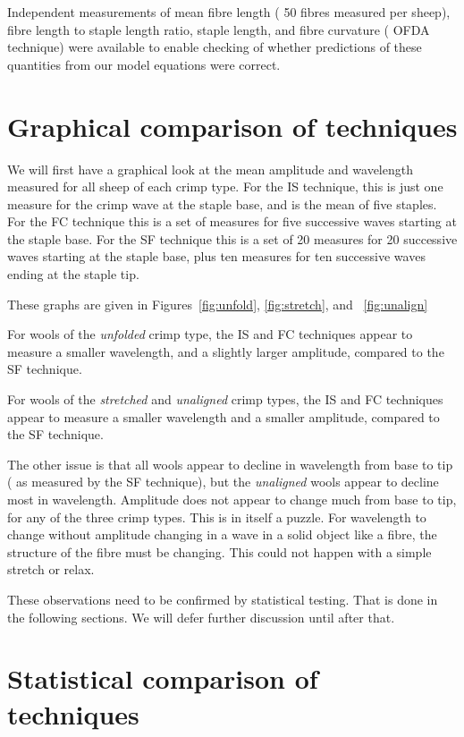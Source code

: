 \documentclass[titlepage,10pt]{article}  %
\begin{document}
Independent measurements of mean fibre length ( 50 fibres measured per sheep), fibre length to staple length ratio, staple length, and fibre curvature ( OFDA technique) were available to enable checking of whether predictions of these quantities from our model  equations were correct.

\section{Graphical comparison of techniques}
We will first have a graphical look at the mean amplitude and wavelength measured for all sheep of each crimp type. For the IS technique, this is just one measure for the crimp wave at the staple base, and is the mean of five staples. For the FC technique this is a set of  measures for five successive waves starting at the staple base. For the SF technique this is a set of 20 measures for 20 successive waves starting at the staple base, plus ten measures for ten successive waves ending at the staple tip. 

These graphs are given in Figures~\ref{fig:unfold}, \ref{fig:stretch}, and ~\ref{fig:unalign}




For wools of the {\em unfolded} crimp type, the IS and FC techniques appear to measure a smaller wavelength, and a slightly larger amplitude, compared to the SF technique.

For wools of the {\em stretched} and {\em unaligned} crimp types, the IS and FC techniques appear to measure a smaller wavelength and a smaller amplitude, compared to the SF technique.

The other issue is that all wools appear to decline in wavelength from base to tip ( as measured by the SF technique), but the {\em unaligned} wools appear to decline most in wavelength. Amplitude does not appear to change much from base to tip, for any of the three crimp types. This is in itself a puzzle. For wavelength to change without amplitude changing in a wave in a solid object like a fibre, the structure of the fibre must be changing. This could not happen with a simple stretch or relax.

These observations need to be confirmed by statistical testing. That is done in the following sections. We will defer further discussion until after that.

\clearpage
\section{Statistical comparison of techniques}
\end{document}

